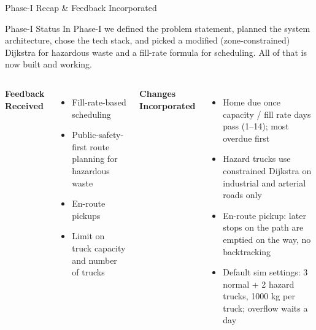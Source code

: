 \documentclass[aspectratio=169,11pt]{beamer}
\begin{document}
\begin{frame}{Phase-I Recap \& Feedback Incorporated}
\scriptsize

\begin{block}{Phase-I Status}
In Phase-I we defined the problem statement, planned the system architecture, chose the tech stack,
and picked a modified (zone-constrained) Dijkstra for hazardous waste and a fill-rate formula for scheduling.
All of that is now built and working.
\end{block}

\vspace{2mm}

\begin{columns}[T,totalwidth=\textwidth]


\textbf{\color{GEUBlue}Feedback Received}

\begin{itemize}\itemsep2pt
\item Fill-rate-based scheduling
\item Public-safety-first route planning for hazardous waste
\item En-route pickups
\item Limit on truck capacity and number of trucks
\end{itemize}


\textbf{\color{GEUBlue}Changes Incorporated}

\begin{itemize}\itemsep2pt
\item Home due once capacity / fill rate days pass (1--14); most overdue first
\item Hazard trucks use constrained Dijkstra on industrial and arterial roads only
\item En-route pickup: later stops on the path are emptied on the way, no backtracking
\item Default sim settings: 3 normal + 2 hazard trucks, 1000 kg per truck; overflow waits a day
\end{itemize}

\end{columns}

\end{frame}
\end{document}
